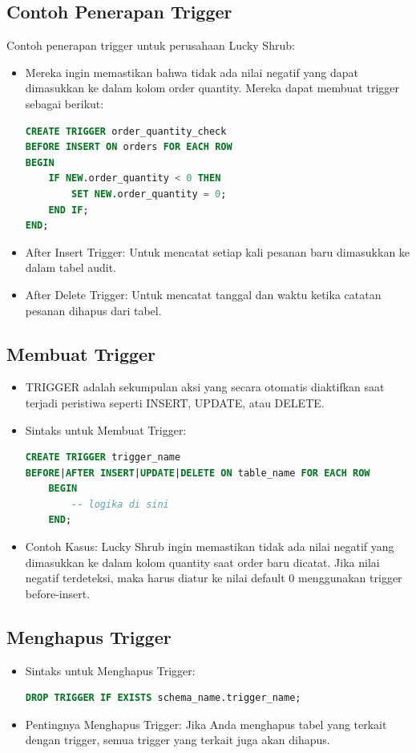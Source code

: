 \documentclass{article}
\begin{document}
\subsection{Contoh Penerapan Trigger}
Contoh penerapan trigger untuk perusahaan Lucky Shrub:
\begin{itemize}
    \item Mereka ingin memastikan bahwa tidak ada nilai negatif yang dapat dimasukkan ke dalam kolom order quantity. Mereka dapat membuat trigger sebagai berikut:
          \begin{lstlisting}[language=SQL, caption={}, captionpos=b]
CREATE TRIGGER order_quantity_check
BEFORE INSERT ON orders FOR EACH ROW
BEGIN
    IF NEW.order_quantity < 0 THEN
        SET NEW.order_quantity = 0;
    END IF;
END;
\end{lstlisting}
    \item After Insert Trigger: Untuk mencatat setiap kali pesanan baru dimasukkan ke dalam tabel audit.
    \item After Delete Trigger: Untuk mencatat tanggal dan waktu ketika catatan pesanan dihapus dari tabel.
\end{itemize}

\subsection{Membuat Trigger}
\begin{itemize}
    \item TRIGGER adalah sekumpulan aksi yang secara otomatis diaktifkan saat terjadi peristiwa seperti INSERT, UPDATE, atau DELETE.
    \item Sintaks untuk Membuat Trigger:
          \begin{lstlisting}[language=SQL, caption={}, captionpos=b]
CREATE TRIGGER trigger_name
BEFORE|AFTER INSERT|UPDATE|DELETE ON table_name FOR EACH ROW
    BEGIN
        -- logika di sini
    END;
\end{lstlisting}
    \item Contoh Kasus: Lucky Shrub ingin memastikan tidak ada nilai negatif yang dimasukkan ke dalam kolom quantity saat order baru dicatat. Jika nilai negatif terdeteksi, maka harus diatur ke nilai default 0 menggunakan trigger before-insert.
\end{itemize}

\subsection{Menghapus Trigger}
\begin{itemize}
    \item Sintaks untuk Menghapus Trigger:
          \begin{lstlisting}[language=SQL, caption={}, captionpos=b]
DROP TRIGGER IF EXISTS schema_name.trigger_name;
\end{lstlisting}
    \item Pentingnya Menghapus Trigger: Jika Anda menghapus tabel yang terkait dengan trigger, semua trigger yang terkait juga akan dihapus.
\end{itemize}
\end{document}
